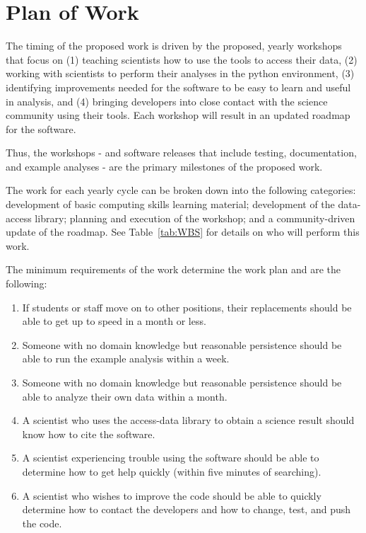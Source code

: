 \section{Plan of Work}
\label{sec:planofwork}


The timing of the proposed work is driven by the proposed, yearly workshops that focus on (1) teaching scientists how to use the tools to access their data, (2) working with scientists to perform their analyses in the python environment, (3) identifying improvements needed for the software to be easy to learn and useful in analysis, and (4) bringing developers into close contact with the science community using their tools.  Each workshop will result in an updated roadmap for the software.

Thus, the workshops - and software releases that include testing, documentation, and example analyses - are the primary milestones of the proposed work.

The work for each yearly cycle can be broken down into the following categories: development of basic computing skills learning material; development of the data-access library; planning and execution of the workshop; and a community-driven update of the roadmap.  See Table~\ref{tab:WBS} for details on who will perform this work.

The minimum requirements of the work determine the work plan and are the following:

\begin{enumerate}
    \item If students or staff move on to other positions, their replacements should be able to get up to speed in a month or less.
    \item Someone with no domain knowledge but reasonable persistence should be able to run the example analysis within a week.
    \item Someone with no domain knowledge but reasonable persistence should be able to analyze their own data within a month.
    \item A scientist who uses the access-data library to obtain a science result should know how to cite the software.
    \item A scientist experiencing trouble using the software should be able to determine how to get help quickly (within five minutes of searching).
    \item A scientist who wishes to improve the code should be able to quickly determine how to contact the developers and how to change, test, and push the code.
\end{enumerate}

